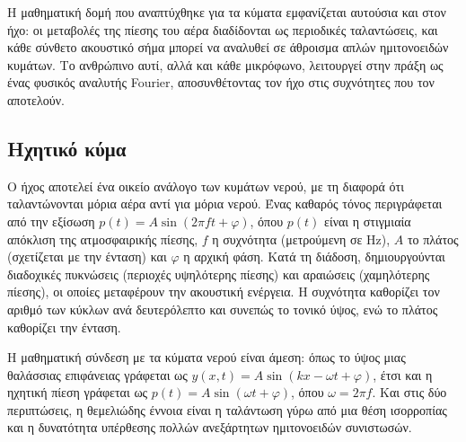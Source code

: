 \documentclass[a4paper, 11pt]{article}
\begin{document}
Η μαθηματική δομή που αναπτύχθηκε για τα κύματα εμφανίζεται αυτούσια και
στον ήχο: οι μεταβολές της πίεσης του αέρα διαδίδονται ως περιοδικές
ταλαντώσεις, και κάθε σύνθετο ακουστικό σήμα μπορεί να αναλυθεί σε
άθροισμα απλών ημιτονοειδών κυμάτων. Το ανθρώπινο αυτί, αλλά και κάθε
μικρόφωνο, λειτουργεί στην πράξη ως ένας φυσικός αναλυτής Fourier,
αποσυνθέτοντας τον ήχο στις συχνότητες που τον αποτελούν.

\subsection{Ηχητικό
κύμα}\label{ux3b7ux3c7ux3b7ux3c4ux3b9ux3baux3cc-ux3baux3cdux3bcux3b1}

Ο ήχος αποτελεί ένα οικείο ανάλογο των κυμάτων νερού, με τη διαφορά ότι
ταλαντώνονται μόρια αέρα αντί για μόρια νερού. Ένας καθαρός τόνος
περιγράφεται από την εξίσωση \(p(t) = A \sin(2\pi f t + \varphi)\), όπου
\(p(t)\) είναι η στιγμιαία απόκλιση της ατμοσφαιρικής πίεσης, \(f\) η
συχνότητα (μετρούμενη σε Hz), \(A\) το πλάτος (σχετίζεται με την ένταση)
και \(\varphi\) η αρχική φάση. Κατά τη διάδοση, δημιουργούνται
διαδοχικές πυκνώσεις (περιοχές υψηλότερης πίεσης) και αραιώσεις
(χαμηλότερης πίεσης), οι οποίες μεταφέρουν την ακουστική ενέργεια. Η
συχνότητα καθορίζει τον αριθμό των κύκλων ανά δευτερόλεπτο και συνεπώς
το τονικό ύψος, ενώ το πλάτος καθορίζει την ένταση.

Η μαθηματική σύνδεση με τα κύματα νερού είναι άμεση: όπως το ύψος μιας
θαλάσσιας επιφάνειας γράφεται ως
\(y(x,t) = A\sin(kx - \omega t + \varphi)\), έτσι και η ηχητική πίεση
γράφεται ως \(p(t) = A\sin(\omega t + \varphi)\), όπου
\(\omega = 2\pi f\). Και στις δύο περιπτώσεις, η θεμελιώδης έννοια είναι
η ταλάντωση γύρω από μια θέση ισορροπίας και η δυνατότητα υπέρθεσης
πολλών ανεξάρτητων ημιτονοειδών συνιστωσών.
\end{document}
